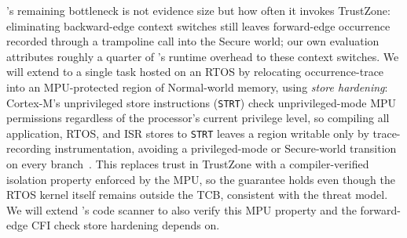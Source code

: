 \enola's remaining bottleneck is not evidence size but how often it invokes TrustZone: eliminating backward-edge context switches still leaves forward-edge occurrence recorded through a trampoline call into the Secure world; our own evaluation attributes roughly a quarter of \enola's runtime overhead to these context switches.
We will extend \enola to a single task hosted on an RTOS by relocating occurrence-trace into an MPU-protected region of Normal-world memory, using \emph{store hardening}: Cortex-M's unprivileged store instructions (\texttt{STRT}) check unprivileged-mode MPU permissions regardless of the processor's current privilege level, so compiling all application, RTOS, and ISR stores to \texttt{STRT} leaves a region writable only by trace-recording instrumentation, avoiding a privileged-mode or Secure-world transition on every branch~\cite{zhou2020silhouette}.
This replaces trust in TrustZone with a compiler-verified isolation property enforced by the MPU, so the guarantee holds even though the RTOS kernel itself remains outside the TCB, consistent with the threat model.
We will extend \enola's code scanner to also verify this MPU property and the forward-edge CFI check store hardening depends on.


